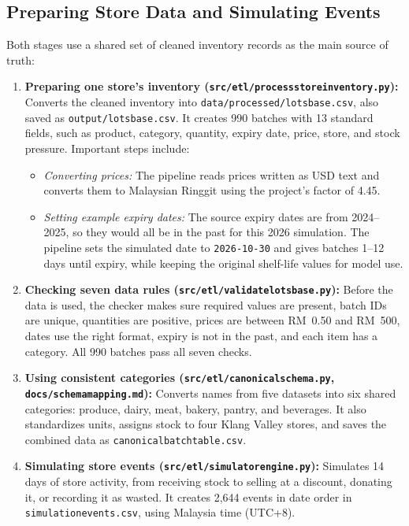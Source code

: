 \documentclass[12pt,a4paper]{article}
\renewcommand{\_}{\oldunderscore\allowbreak}
\begin{document}
\subsection{Preparing Store Data and Simulating Events}
Both stages use a shared set of cleaned inventory records as the main source of truth:

\begin{enumerate}[leftmargin=18pt, itemsep=3pt]
    \item \textbf{Preparing one store's inventory (\texttt{src/etl/process\_store\_inventory.py}):} Converts the cleaned inventory into \texttt{data/processed/lots\_base.csv}, also saved as \texttt{output/lots\_base.csv}. It creates 990 batches with 13 standard fields, such as product, category, quantity, expiry date, price, store, and stock pressure. Important steps include:
    \begin{itemize}[leftmargin=14pt, itemsep=1pt]
        \item \emph{Converting prices:} The pipeline reads prices written as USD text and converts them to Malaysian Ringgit using the project's factor of 4.45.
        \item \emph{Setting example expiry dates:} The source expiry dates are from 2024--2025, so they would all be in the past for this 2026 simulation. The pipeline sets the simulated date to \texttt{2026-10-30} and gives batches 1--12 days until expiry, while keeping the original shelf-life values for model use.
    \end{itemize}
    \item \textbf{Checking seven data rules (\texttt{src/etl/validate\_lots\_base.py}):} Before the data is used, the checker makes sure required values are present, batch IDs are unique, quantities are positive, prices are between RM~0.50 and RM~500, dates use the right format, expiry is not in the past, and each item has a category. All 990 batches pass all seven checks.
    \item \textbf{Using consistent categories (\texttt{src/etl/canonical\_schema.py}, \texttt{docs/schema\_mapping.md}):} Converts names from five datasets into six shared categories: produce, dairy, meat, bakery, pantry, and beverages. It also standardizes units, assigns stock to four Klang Valley stores, and saves the combined data as \texttt{canonical\_batch\_table.csv}.
    \item \textbf{Simulating store events (\texttt{src/etl/simulator\_engine.py}):} Simulates 14 days of store activity, from receiving stock to selling at a discount, donating it, or recording it as wasted. It creates 2,644 events in date order in \texttt{simulation\_events.csv}, using Malaysia time (UTC+8).
\end{enumerate}
\end{document}
